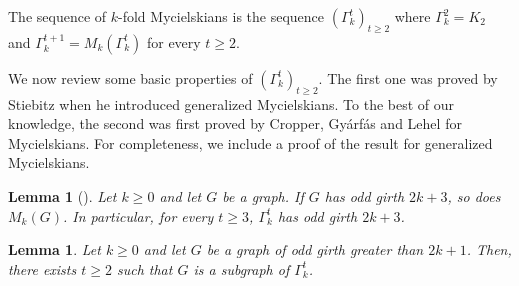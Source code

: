\documentclass{article}
\newtheorem{lemma}[theorem]{Lemma}
\begin{document}
The sequence of $k$-fold Mycielskians is the sequence $(\Gamma_k^t)_{t \geq 2}$ where $\Gamma_k^2 = K_2$ and $\Gamma_k^{t+1} = M_k(\Gamma_k^t)$ for every $t \geq 2$.

We now review some basic properties of $(\Gamma_k^t)_{t \geq 2}$.
The first one was proved by Stiebitz \cite{S85} when he introduced generalized Mycielskians.
To the best of our knowledge, the second was first proved by Cropper, Gy\'arf\'as and Lehel \cite{CGL06} for Mycielskians. For completeness, we include a proof of the result for generalized Mycielskians.

\begin{lemma}[\cite{S85}]\label{lem:og-Myc}
    Let $k \geq 0$ and let $G$ be a graph.
    If $G$ has odd girth $2k+3$, so does $M_k(G)$.
    In particular, for every $t \geq 3$, $\Gamma_k^t$ has odd girth $2k+3$.
\end{lemma}

\begin{lemma}\label{lem:Myc-universal}
    Let $k \geq 0$ and let $G$ be a graph of odd girth greater than $2k+1$.
    Then, there exists $t \geq 2$ such that $G$ is a subgraph of $\Gamma_k^t$.
\end{lemma}
\end{document}
